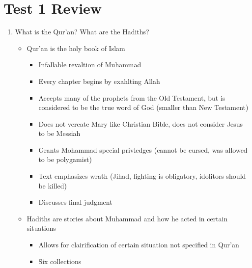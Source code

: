 \documentclass[8pt]{article}
\begin{document}
    \section*{Test 1 Review}
    \begin{enumerate}
        \item What is the Qur'an? What are the Hadiths?
            \begin{itemize}
                \item Qur'an is the holy book of Islam
                \begin{itemize}
                    \item Infallable revaltion of Muhammad
                    \item Every chapter begins by exahlting Allah
                    \item Accepts many of the prophets from the Old Testament, but is considered to be the true word of
                    God (smaller than New Testament)
                    \item Does not vereate Mary like Christian Bible, does not consider Jesus to be Messiah
                    \item Grants Mohammad special privledges (cannot be cursed, was allowed to be polygamist)
                    \item Text emphasizes wrath (Jihad, fighting is obligatory, idolitors should be killed)
                    \item Discusses final judgment
                \end{itemize}
                \item Hadiths are stories about Muhammad and how he acted in certain situations
                \begin{itemize}
                    \item Allows for clairification of certain situation not specified in Qur'an
                    \item Six collections
                \end{itemize}
            \end{itemize}


\end{enumerate}
\end{document}
